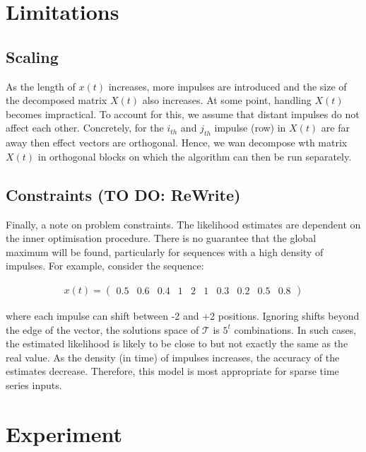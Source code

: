 \documentclass[11pt]{amsart}
\theoremstyle{definition}
\begin{document}
\section{Limitations}
\subsection{Scaling}
As the length of $x(t)$ increases, more impulses are introduced and the size of the decomposed matrix $X(t)$ also increases. At some point, handling $X(t)$ becomes impractical. To account for this, we assume that distant impulses do not affect each other. Concretely, for the $i_{th}$ and $j_{th}$ impulse (row) in $X(t)$ are far away then effect vectors are orthogonal. Hence, we wan decompose wth matrix $X(t)$ in orthogonal blocks on which the algorithm can then be run separately.

\subsection{Constraints (TO DO: ReWrite)}
Finally, a note on problem constraints. The likelihood estimates are dependent on the inner optimisation procedure. There is no guarantee that the global maximum will be found, particularly for sequences with a high density of impulses. For example, consider the sequence:

\begin{align*}
    x(t) = 
    \left(
\begin{array}{cccccccccc}
    0.5 & 0.6 & 0.4 & 1 & 2 & 1 &
    0.3 & 0.2 & 0.5 & 0.8 
\end{array}  
\right)
\end{align*}

where each impulse can shift between -2 and +2 positions. Ignoring shifts beyond the edge of the vector, the solutions space of $\mathcal{T}$ is $5^t$ combinations.  
In such cases, the estimated likelihood is likely to be close to but not exactly the same as the real value. As the density (in time) of impulses increases, the accuracy of the estimates decrease. Therefore, this model is most appropriate for sparse time series inputs.

\section{Experiment}
\end{document}

